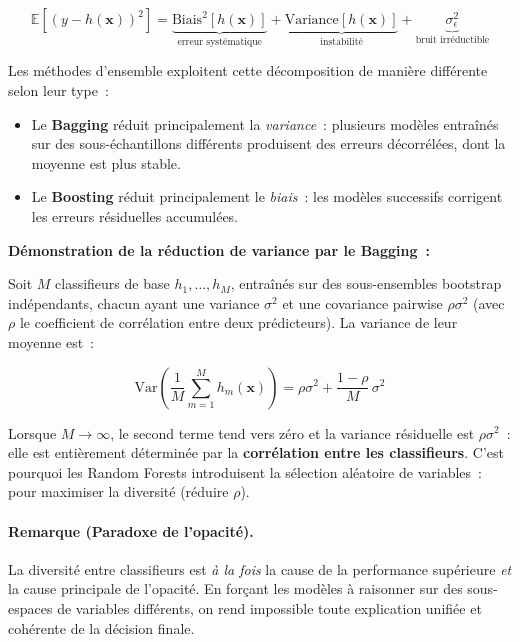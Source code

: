 \begin{equation}
  \mathbb{E}\!\left[(y - h(\mathbf{x}))^2\right]
  = \underbrace{\mathrm{Biais}^2[h(\mathbf{x})]}_{\text{erreur systématique}}
  + \underbrace{\mathrm{Variance}[h(\mathbf{x})]}_{\text{instabilité}}
  + \underbrace{\sigma^2_\epsilon}_{\text{bruit irréductible}}
  \label{eq:biais_variance}
\end{equation}

Les méthodes d'ensemble exploitent cette décomposition de manière différente selon
leur type~:

\begin{itemize}
  \item Le \textbf{Bagging} réduit principalement la \textit{variance}~: plusieurs modèles
        entraînés sur des sous-échantillons différents produisent des erreurs décorrélées,
        dont la moyenne est plus stable.

  \item Le \textbf{Boosting} réduit principalement le \textit{biais}~: les modèles successifs
        corrigent les erreurs résiduelles accumulées.
\end{itemize}

\textbf{Démonstration de la réduction de variance par le Bagging~:}

Soit $M$ classifieurs de base $h_1, \ldots, h_M$, entraînés sur des sous-ensembles
bootstrap indépendants, chacun ayant une variance $\sigma^2$ et une covariance pairwise
$\rho \sigma^2$ (avec $\rho$ le coefficient de corrélation entre deux prédicteurs).
La variance de leur moyenne est~:

\begin{equation}
  \mathrm{Var}\!\left(\frac{1}{M}\sum_{m=1}^{M} h_m(\mathbf{x})\right)
  = \rho \sigma^2 + \frac{1-\rho}{M}\,\sigma^2
  \label{eq:variance_bagging}
\end{equation}

Lorsque $M \to \infty$, le second terme tend vers zéro et la variance résiduelle
est $\rho \sigma^2$~: elle est entièrement déterminée par la \textbf{corrélation entre les
classifieurs}. C'est pourquoi les Random Forests introduisent la sélection aléatoire
de variables~: pour maximiser la diversité (réduire $\rho$).

\paragraph{Remarque (Paradoxe de l'opacité).}
La diversité entre classifieurs est \textit{à la fois} la cause de la performance supérieure
\textit{et} la cause principale de l'opacité. En forçant les modèles à raisonner sur des
sous-espaces de variables différents, on rend impossible toute explication unifiée et
cohérente de la décision finale.

